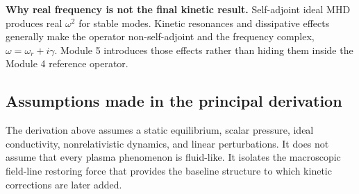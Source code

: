 \begin{notebox}
\textbf{Why real frequency is not the final kinetic result.} Self-adjoint ideal MHD produces real $\omega^2$ for stable modes. Kinetic resonances and dissipative effects generally make the operator non-self-adjoint and the frequency complex, $\omega=\omega_r+i\gamma$. Module 5 introduces those effects rather than hiding them inside the Module 4 reference operator.
\end{notebox}

\subsection{Assumptions made in the principal derivation}
The derivation above assumes a static equilibrium, scalar pressure, ideal conductivity, nonrelativistic dynamics, and linear perturbations. It does not assume that every plasma phenomenon is fluid-like. It isolates the macroscopic field-line restoring force that provides the baseline structure to which kinetic corrections are later added.
